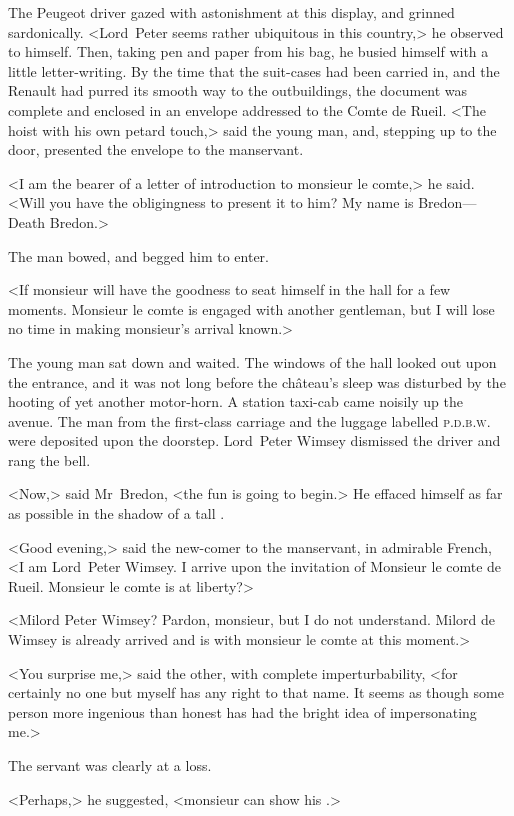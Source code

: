 The Peugeot driver gazed with astonishment at this display, and grinned sardonically. <Lord~Peter seems rather ubiquitous in this country,> he observed to himself. Then, taking pen and paper from his bag, he busied himself with a little letter-writing. By the time that the suit-cases had been carried in, and the Renault had purred its smooth way to the outbuildings, the document was complete and enclosed in an envelope addressed to the Comte de Rueil. <The hoist with his own petard touch,> said the young man, and, stepping up to the door, presented the envelope to the manservant.

<I am the bearer of a letter of introduction to monsieur le comte,> he said. <Will you have the obligingness to present it to him? My name is Bredon—Death Bredon.>

The man bowed, and begged him to enter.

<If monsieur will have the goodness to seat himself in the hall for a few moments. Monsieur le comte is engaged with another gentleman, but I will lose no time in making monsieur's arrival known.>

The young man sat down and waited. The windows of the hall looked out upon the entrance, and it was not long before the château's sleep was disturbed by the hooting of yet another motor-horn. A station taxi-cab came noisily up the avenue. The man from the first-class carriage and the luggage labelled \textsc{p.d.b.w.} were deposited upon the doorstep. Lord~Peter Wimsey dismissed the driver and rang the bell.

<Now,> said Mr~Bredon, <the fun is going to begin.> He effaced himself as far as possible in the shadow of a tall .

<Good evening,> said the new-comer to the manservant, in admirable French, <I am Lord~Peter Wimsey. I arrive upon the invitation of Monsieur le comte de Rueil. Monsieur le comte is at liberty?>

<Milord Peter Wimsey? Pardon, monsieur, but I do not understand. Milord de Wimsey is already arrived and is with monsieur le comte at this moment.>

<You surprise me,> said the other, with complete imperturbability, <for certainly no one but myself has any right to that name. It seems as though some person more ingenious than honest has had the bright idea of impersonating me.>

The servant was clearly at a loss.

<Perhaps,> he suggested, <monsieur can show his .>

